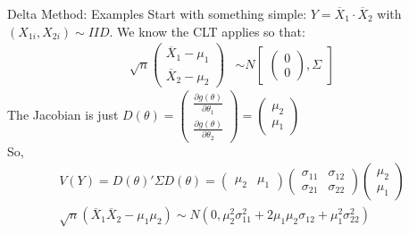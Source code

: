   
\begin{frame}{Delta Method: Examples}
  Start with something simple: $Y= \overline{X}_1\cdot \overline{X}_2$ with $(X_{1i},X_{2i}) \sim IID$.
  We know the CLT applies so that:
  \begin{eqnarray*}
  \sqrt{n}
  \begin{pmatrix}
  \overline{X}_1 - \mu_1\\
  \overline{X}_2 - \mu_2
  \end{pmatrix} &\sim  N
  \begin{bmatrix}
  \begin{pmatrix}
  0\\
  0
  \end{pmatrix},
  \Sigma
  \end{bmatrix}
  \end{eqnarray*}
  The Jacobian is just $D(\theta) =  \begin{pmatrix}\frac{\partial g(\theta)}{\partial \theta_1} \\ \frac{\partial g(\theta)}{\partial \theta_2}  \end{pmatrix} =  \begin{pmatrix}\mu_2\\ \mu_1 \end{pmatrix}$\\
  So,
  \begin{eqnarray*}
  V(Y) = D(\theta)' \Sigma D(\theta) =\begin{pmatrix} \mu_2 & \mu_1 \end{pmatrix}  \begin{pmatrix} \sigma_{11} & \sigma_{12} \\ \sigma_{21} & \sigma_{22} \end{pmatrix} \begin{pmatrix} \mu_2 \\\mu_1  
  \end{pmatrix} \\
  \sqrt{n} ( \overline{X}_1 \overline{X}_2 - \mu_1 \mu_2) \sim N(0,\mu_2^2 \sigma_{11}^2 + 2 \mu_1 \mu_2 \sigma_{12}  + \mu_1^2 \sigma_{22}^2)
  \end{eqnarray*}
\end{frame}
  
